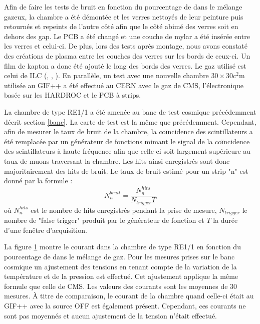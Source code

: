  Afin de faire les tests de bruit en fonction du pourcentage de  dans le mélange gazeux, la chambre a été démontée et les verres nettoyés de leur peinture puis retournés et repeints de l'autre côté afin que le côté abimé des verres soit en dehors des gap. Le PCB a été changé et une couche de mylar a été insérée entre les verres et celui-ci. De plus, lors des tests après montage, nous avons constaté des créations de plasma entre les couches des verres sur les bords de ceux-ci. Un film de kapton a donc été ajouté le long des bords des verres. Le gaz utilisé est celui de ILC (, , ). En parallèle, un test avec une nouvelle chambre $\num{30}\times\num{30}\si{\square\centi\meter}$ utilisée au GIF++ a été effectué au CERN avec le gaz de CMS, l'électronique basée sur les HARDROC et le PCB à strips.
 
 La chambre de type RE1/1 a été amenée au banc de test cosmique précédemment décrit section \ref{banc}. La carte de test est la même que précédemment. Cependant, afin de mesurer le taux de bruit de la chambre, la coïncidence des scintillateurs a été remplacée par un générateur de fonctions mimant le signal de la coïncidence des scintillateurs à haute fréquence afin que celle-ci soit largement supérieure au taux de muons traversant la chambre. Les hits ainsi enregistrés sont donc majoritairement des hits de bruit. Le taux de bruit estimé pour un strip "n" est donné par la formule :
 \begin{equation}
 N_n^{bruit}=\frac{N_n^{hits}}{N_{trigger}T}
 \end{equation}
 où $N_n^{hits}$ est le nombre de hits enregistrés pendant la prise de mesure, $N_{trigger}$ le nombre de "false trigger" produit par le générateur de fonction et $T$ la durée d'une fenêtre d'acquisition.
 
 La figure \ref{CurrentDOME} montre le courant dans la chambre de type RE1/1 en fonction du pourcentage de  dans le mélange de gaz. Pour les mesures prises sur le banc cosmique un ajustement des tensions en tenant compte de la variation de la température et de la pression est effectué. Cet ajustement applique la même formule que celle de CMS. Les valeurs des courants sont les moyennes de 30 mesures. À titre de comparaison, le courant de la chambre quand celle-ci était au GIF++ avec la source OFF est également présent. Cependant, ces courants ne sont pas moyennés et aucun ajustement de la tension n'était effectué.
 
\begin{figure}[ht!]
	\centering
	\label{CurrentDOME}
\end{figure}
 
